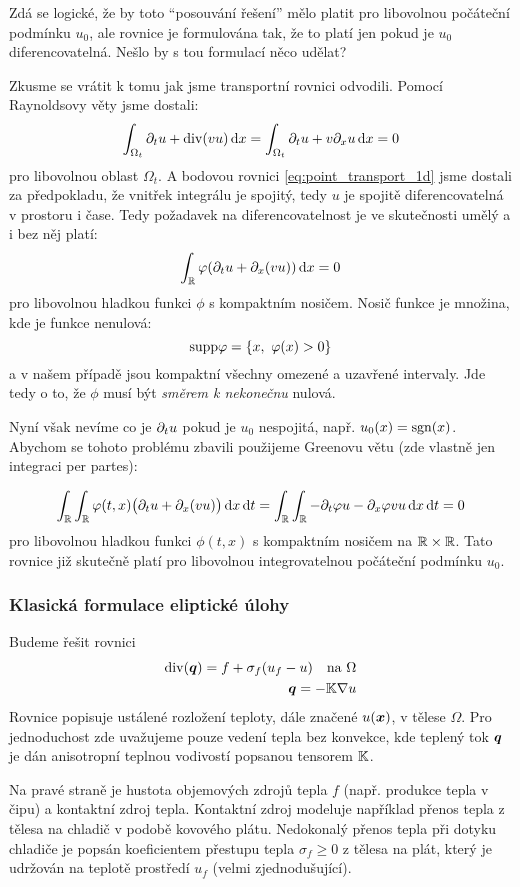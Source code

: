 Zdá se logické, že by toto ``posouvání řešení'' mělo platit pro libovolnou počáteční podmínku 
$u_0$, ale rovnice je formulována tak, že to platí jen pokud je $u_0$ diferencovatelná. 
Nešlo by s tou formulací něco udělat?

Zkusme se vrátit k tomu jak jsme transportní rovnici odvodili. Pomocí Raynoldsovy věty jsme dostali:
\[
    \int_{\Omega_t} \partial_t u + \operatorname{div}(v u) \,{\rm d} x= \int_{\Omega_t} \partial_t u + v\partial_x u \,{\rm d} x= 0
\]
pro libovolnou oblast $\Omega_t$. A bodovou rovnici \eqref{eq:point_transport_1d} 
jsme dostali za předpokladu, že vnitřek integrálu je spojitý, 
tedy $u$ je spojitě diferencovatelná v prostoru i čase. 
Tedy požadavek na diferencovatelnost je ve skutečnosti umělý a i bez něj platí:
\[
    \int_{\mathbb R} \varphi(\partial_t u + \partial_x(vu)) \,{\rm d} x = 0
\]
pro libovolnou hladkou funkci $\phi$ s kompaktním nosičem. 
Nosič funkce je množina, kde je funkce nenulová:
\[
    {\rm supp} \varphi = \{ x,\ \varphi(x) > 0\}
\]
a v našem případě jsou kompaktní všechny omezené a uzavřené intervaly. 
Jde tedy o to, že $\phi$ musí být \emph{směrem k nekonečnu} nulová.

Nyní však nevíme co je $\partial_t u$ pokud je $u_0$ nespojitá, 
např. $u_0(x)=\operatorname{sgn}(x)$. Abychom se tohoto problému zbavili použijeme Greenovu větu 
(zde vlastně jen integraci per partes):

\[
    \int_{\mathbb R} \int_{\mathbb R} \varphi(t,x)\big(\partial_t u + \partial_x(vu)\big) \,{\rm d} x \,{\rm d} t= 
    \int_{\mathbb R} \int_{\mathbb R} -\partial_t \varphi u - \partial_x \varphi vu \,{\rm d} x \,{\rm d} t = 0
\]
pro libovolnou hladkou funkci $\phi(t,x)$ s kompaktním nosičem na ${\mathbb R} \times {\mathbb R}$.
Tato rovnice již skutečně platí pro libovolnou integrovatelnou počáteční podmínku $u_0$.


\subsubsection{Klasická formulace eliptické úlohy}
\label{sec:weak_sol_elliptic_eq}
Budeme řešit rovnici
\begin{align}
   \operatorname{div}(\mathbf{\boldsymbol{q}}) =f + \sigma_f(u_f - u) \quad\text{na }\Omega \\
   \mathbf{\boldsymbol{q}} = -{\mathbb{K}}\nabla u
    \label{eq:elliptic}
\end{align}
Rovnice popisuje ustálené rozložení teploty, dále značené $u(\mathbf{\boldsymbol{x}})$, v tělese $\Omega$. 
Pro jednoduchost zde uvažujeme pouze vedení tepla bez konvekce, kde teplený tok $\mathbf{\boldsymbol{q}}$ je dán 
anisotropní teplnou vodivostí popsanou tensorem ${\mathbb{K}}$. 

Na pravé straně je hustota objemových zdrojů 
tepla $f$ (např. produkce tepla v čipu) a kontaktní zdroj tepla. 
Kontaktní zdroj modeluje například přenos tepla z tělesa na chladič v podobě kovového plátu.
Nedokonalý přenos tepla při dotyku chladiče je popsán koeficientem přestupu tepla $\sigma_f\ge 0$ 
z tělesa na plát, který je udržován na teplotě prostředí $u_f$ (velmi zjednodušující).


